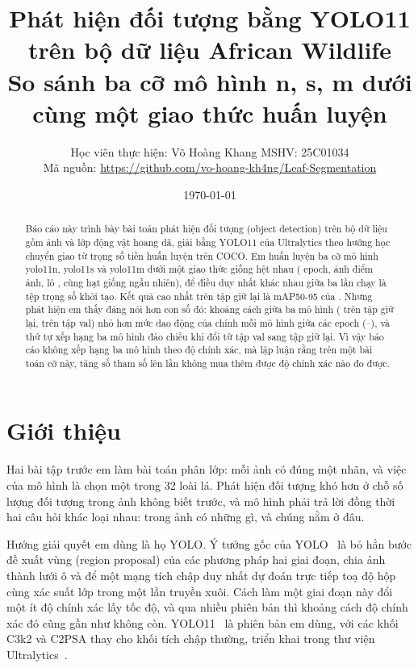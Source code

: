 \documentclass[11pt,a4paper]{article}
\title{\vspace{-1.5cm}Phát hiện đối tượng bằng YOLO11 trên bộ dữ liệu African Wildlife\\
\large So sánh ba cỡ mô hình n, s, m dưới cùng một giao thức huấn luyện}
\author{Học viên thực hiện: Võ Hoàng Khang \quad MSHV: 25C01034\\[0.3em]
\small Mã nguồn: \url{https://github.com/vo-hoang-kh4ng/Leaf-Segmentation}}
\date{\today}
\begin{document}
\maketitle
\vspace{-0.8cm}

\begin{abstract}
\noindent
Báo cáo này trình bày bài toán phát hiện đối tượng (object detection) trên bộ dữ liệu
\dataname{} gồm \ntotal{} ảnh và \nclasses{} lớp động vật hoang dã, giải bằng YOLO11 của
Ultralytics theo hướng học chuyển giao từ trọng số tiền huấn luyện trên COCO. Em huấn luyện ba cỡ
mô hình yolo11n, yolo11s và yolo11m dưới một giao thức giống hệt nhau (\epochs{} epoch, ảnh
\imgsz{} điểm ảnh, lô \batch{}, cùng hạt giống ngẫu nhiên), để điều duy nhất khác nhau giữa ba
lần chạy là tệp trọng số khởi tạo. Kết quả cao nhất trên tập giữ lại là mAP50-95 \besttestmap{} của
\besttest{}. Nhưng phát hiện em thấy đáng nói hơn con số đó: khoảng cách giữa ba mô hình
(\testspread{} trên tập giữ lại, \valspread{} trên tập val) nhỏ hơn mức dao động của chính mỗi mô
hình giữa các epoch (\minstd{}--\maxstd{}), và thứ tự xếp hạng ba mô hình đảo chiều khi đổi từ tập
val sang tập giữ lại. Vì vậy báo cáo không xếp hạng ba mô hình theo độ chính xác, mà lập luận rằng
trên một bài toán cỡ này, tăng số tham số lên \paramratio{} lần không mua thêm được độ chính xác
nào đo được.
\end{abstract}

\section{Giới thiệu}

Hai bài tập trước em làm bài toán phân lớp: mỗi ảnh có đúng một nhãn, và việc của mô hình là chọn
một trong 32 loài lá. Phát hiện đối tượng khó hơn ở chỗ số lượng đối tượng trong ảnh không biết
trước, và mô hình phải trả lời đồng thời hai câu hỏi khác loại nhau: trong ảnh có những gì, và
chúng nằm ở đâu.

Hướng giải quyết em dùng là họ YOLO. Ý tưởng gốc của YOLO~\cite{redmon2016} là bỏ hẳn bước đề xuất
vùng (region proposal) của các phương pháp hai giai đoạn, chia ảnh thành lưới ô và để một mạng tích
chập duy nhất dự đoán trực tiếp toạ độ hộp cùng xác suất lớp trong một lần truyền xuôi. Cách làm
một giai đoạn này đổi một ít độ chính xác lấy tốc độ, và qua nhiều phiên bản thì khoảng cách độ
chính xác đó cũng gần như không còn. YOLO11~\cite{khanam2024} là phiên bản em dùng, với các khối
C3k2 và C2PSA thay cho khối tích chập thường, triển khai trong thư viện Ultralytics~\cite{jocher2023}.
\end{document}
